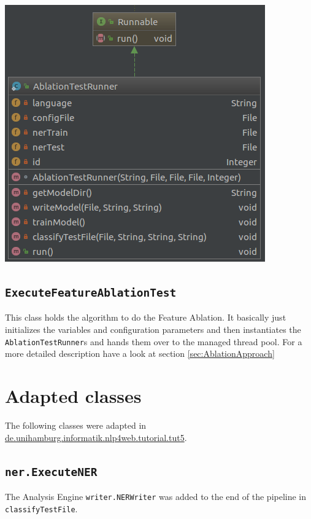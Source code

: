 \documentclass[11pt, english]{article}
\begin{document}
\includegraphics[scale=0.5]{gfx/AblationTestRunner.png}
\label{fig:AblationTestRunner}


\subsection{\texttt{ExecuteFeatureAblationTest}}
\label{sec:ExecuteFeatureAblationTest}
This class holds the algorithm to do the Feature Ablation. It basically just initializes the variables and configuration parameters and then instantiates the \verb/AblationTestRunner/s and hands them over to the managed thread pool. For a more detailed description have a look at section \ref{sec:AblationApproach}



\section{Adapted classes}
The following classes were adapted in \url{de.unihamburg.informatik.nlp4web.tutorial.tut5}.

\subsection{\texttt{ner.ExecuteNER}}
The Analysis Engine \verb/writer.NERWriter/ was added to the end of the pipeline in \verb/classifyTestFile/.
\end{document}

